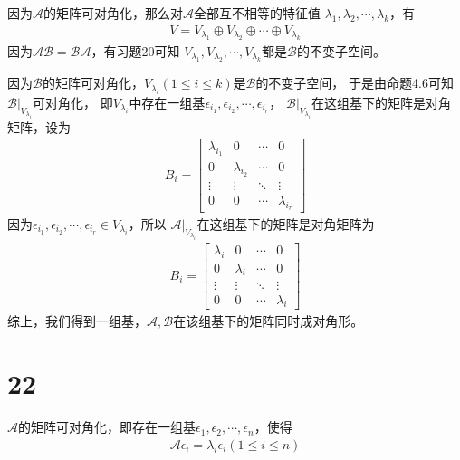 \documentclass{article}
\begin{document}
因为$\mathscr{A}$的矩阵可对角化，那么对$\mathscr{A}$全部互不相等的特征值
$\lambda_1, \lambda_2, \cdots, \lambda_k$，有
\begin{align*}
  V = V_{\lambda_1} \oplus V_{\lambda_2} \oplus \cdots \oplus V_{\lambda_k}
\end{align*}
因为$\mathscr{A} \mathscr{B} = \mathscr{B} \mathscr{A}$，有习题20可知
$V_{\lambda_1}, V_{\lambda_2}, \cdots , V_{\lambda_k}$都是$\mathscr{B}$的不变子空间。

因为$\mathscr{B}$的矩阵可对角化，$V_{\lambda_i} (1 \leq i \leq k)$是$\mathscr{B}$的不变子空间，
于是由命题4.6可知$\mathscr{B}|_{V_{\lambda_i}}$可对角化，
即$V_{\lambda_i}$中存在一组基$\epsilon_{i_1},\epsilon_{i_2}, \cdots, \epsilon_{i_r}$，
$\mathscr{B}|_{V_{\lambda_i}}$在这组基下的矩阵是对角矩阵，设为
\begin{align*}
  B_i = \begin{bmatrix}
          \lambda_{i_1} & 0             & \cdots & 0             \\
          0             & \lambda_{i_2} & \cdots & 0             \\
          \vdots        & \vdots        & \ddots & \vdots        \\
          0             & 0             & \cdots & \lambda_{i_r}
        \end{bmatrix}
\end{align*}
因为$\epsilon_{i_1},\epsilon_{i_2}, \cdots, \epsilon_{i_r} \in V_{\lambda_i}$，所以
$\mathscr{A}|_{V_{\lambda_i}}$在这组基下的矩阵是对角矩阵为
\begin{align*}
  B_i = \begin{bmatrix}
          \lambda_{i} & 0           & \cdots & 0           \\
          0           & \lambda_{i} & \cdots & 0           \\
          \vdots      & \vdots      & \ddots & \vdots      \\
          0           & 0           & \cdots & \lambda_{i}
        \end{bmatrix}
\end{align*}
综上，我们得到一组基，$\mathscr{A}, \mathscr{B}$在该组基下的矩阵同时成对角形。

\section*{22}

$\mathscr{A}$的矩阵可对角化，即存在一组基$\epsilon_1, \epsilon_2, \cdots, \epsilon_n$，使得
\begin{align*}
  \mathscr{A} \epsilon_i = \lambda_i \epsilon_i (1 \leq i \leq n)
\end{align*}
\end{document}
